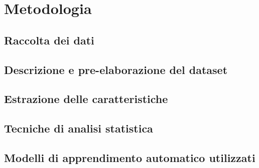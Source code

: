 \chapter{Metodologia}
    \section{Raccolta dei dati}
    \section{Descrizione e pre-elaborazione del dataset}
    \section{Estrazione delle caratteristiche}
    \section{Tecniche di analisi statistica}
    \section{Modelli di apprendimento automatico utilizzati}